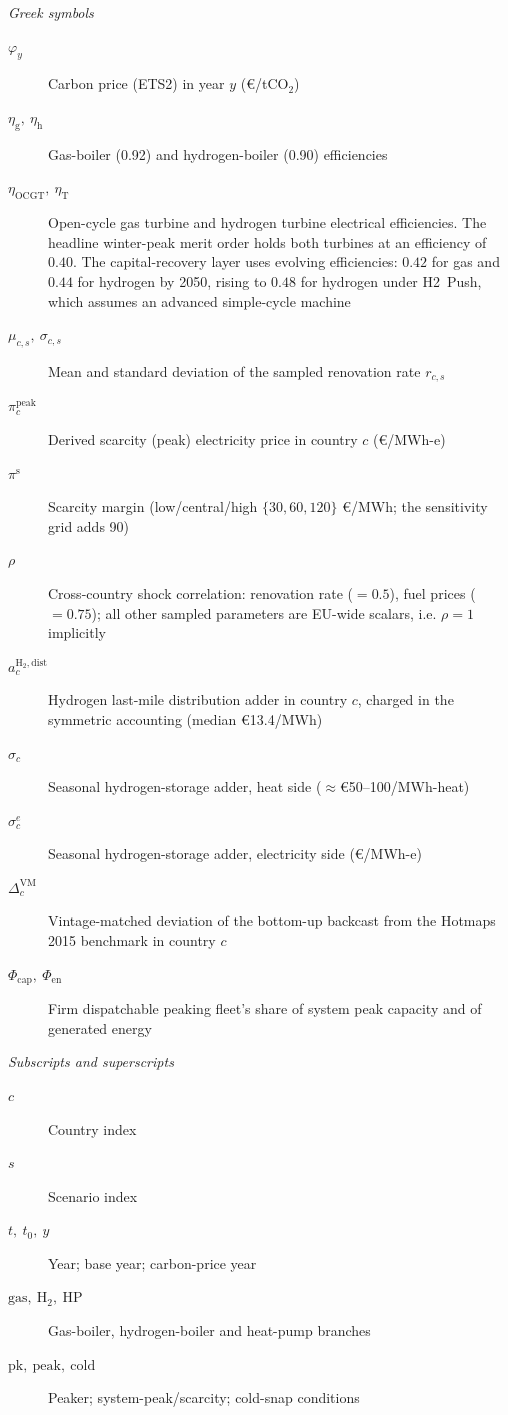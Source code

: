 \textit{Greek symbols}
\begin{description}
 \item[$\varphi_{y}$] Carbon price (ETS2) in year $y$ (\euro{}/tCO$_2$)
 \item[$\eta_{\mathrm{g}},\ \eta_{\mathrm{h}}$] Gas-boiler (0.92) and hydrogen-boiler (0.90) efficiencies
 \item[$\eta_{\mathrm{OCGT}},\ \eta_{\mathrm{T}}$] Open-cycle gas turbine and hydrogen turbine electrical efficiencies. The headline winter-peak merit order holds both turbines at an efficiency of $0.40$. The capital-recovery layer uses evolving efficiencies: $0.42$ for gas and $0.44$ for hydrogen by 2050, rising to $0.48$ for hydrogen under H2~Push, which assumes an advanced simple-cycle machine
 \item[$\mu_{c,s},\ \sigma_{c,s}$] Mean and standard deviation of the sampled renovation rate $r_{c,s}$
 \item[$\pi^{\mathrm{peak}}_{c}$] Derived scarcity (peak) electricity price in country $c$ (\euro{}/MWh-e)
 \item[$\pi^{\mathrm{s}}$] Scarcity margin (low/central/high $\{30,60,120\}$ \euro{}/MWh; the sensitivity grid adds 90)
 \item[$\rho$] Cross-country shock correlation: renovation rate ($=0.5$),
 fuel prices ($=0.75$); all other sampled parameters are EU-wide scalars, i.e.
 $\rho=1$ implicitly
 \item[$a^{\mathrm{H_2,dist}}_{c}$] Hydrogen last-mile distribution adder in country $c$, charged in the symmetric accounting (median \euro{}13.4/MWh)
 \item[$\sigma_{c}$] Seasonal hydrogen-storage adder, heat side ($\approx$\euro{}50--100/MWh-heat)
 \item[$\sigma^{e}_{c}$] Seasonal hydrogen-storage adder, electricity side (\euro{}/MWh-e)
 \item[$\Delta_{c}^{\mathrm{VM}}$] Vintage-matched deviation of the bottom-up backcast from the Hotmaps 2015 benchmark in country $c$
 \item[$\Phi_{\mathrm{cap}},\ \Phi_{\mathrm{en}}$] Firm dispatchable peaking fleet's share of system peak capacity and of generated energy
\end{description}

\textit{Subscripts and superscripts}
\begin{description}
 \item[$c$] Country index
 \item[$s$] Scenario index
 \item[$t,\ t_{0},\ y$] Year; base year; carbon-price year
 \item[$\mathrm{gas},\ \mathrm{H_2},\ \mathrm{HP}$] Gas-boiler, hydrogen-boiler and heat-pump branches
 \item[$\mathrm{pk},\ \mathrm{peak},\ \mathrm{cold}$] Peaker; system-peak/scarcity; cold-snap conditions
\end{description}
